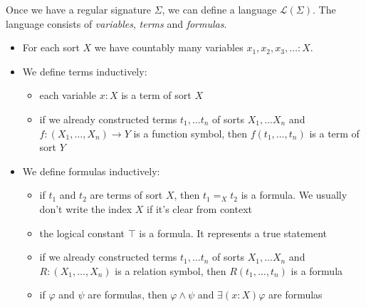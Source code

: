 \documentclass[14pt]{beamer}
\theoremstyle{plain}
\begin{document}
  \begin{frame}
    Once we have a regular signature $\Sigma$, we can define a language $\mathcal{L}(\Sigma)$.
    \pause
    The language consists of \emph{variables}, \emph{terms} and \emph{formulas}.
    \pause
    \begin{itemize}
      \pause
      \item For each sort $X$ we have countably many variables $x_1, x_2, x_3, \ldots : X$.
      \vspace{1em}
      \pause
      \item We define terms inductively:
        \begin{itemize}
          \vspace{1em}
          \pause
          \item each variable $x : X$ is a term of sort $X$
          \vspace{1em}
          \pause
          \item if we already constructed terms $t_1, \ldots t_n$ of sorts $X_1, \ldots X_n$
            and $f : (X_1, \ldots, X_n) \to Y$ is a function symbol, then $f(t_1, \ldots, t_n)$
            is a term of sort $Y$
        \end{itemize}
    \end{itemize}
  \end{frame}

  \begin{frame}
    \begin{itemize}
      \item We define formulas inductively:
      \vspace{1em}
      \pause
        \begin{itemize}
          \item if $t_1$ and $t_2$ are terms of sort $X$, then $t_1 =_X t_2$ is a formula.
            \pause
            We usually don't write the index $X$ if it's clear from context
          \vspace{1em}
          \pause
          \item the logical constant $\top$ is a formula. It represents a true statement
          \vspace{1em}
          \pause
          \item if we already constructed terms $t_1, \ldots t_n$ of sorts $X_1, \ldots X_n$
            and $R : (X_1, \ldots, X_n)$ is a relation symbol, then $R(t_1, \ldots, t_n)$
            is a formula
          \vspace{1em}
          \pause
          \item if $\varphi$ and $\psi$ are formulas, then $\varphi \land \psi$ and $\exists (x : X) \varphi$
            are formulas
        \end{itemize}
    \end{itemize}
  \end{frame}
\end{document}
